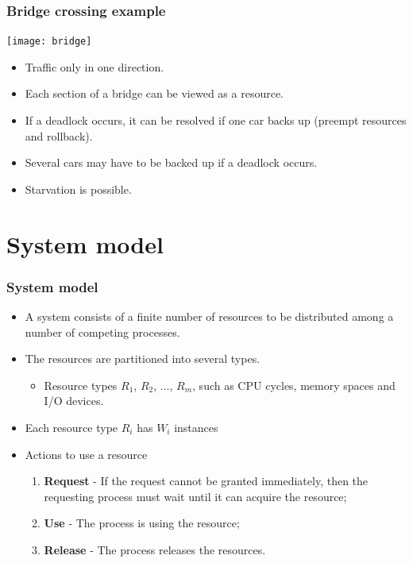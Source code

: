 \documentclass[CJKutf8,xcolor=pdftex,dvipsnames,table]{beamer}
\begin{document}
\begin{CJK*}{UTF8}{song}
  \begin{frame}
  \frametitle{Bridge crossing example} \pause
  \begin{center}
    \texttt{[image: bridge]} \pause
  \end{center}
  \begin{itemize}
  \item{Traffic only in one direction.} \pause
  \item{Each section of a bridge can be viewed as a resource.} \pause
  \item{If a deadlock occurs, it can be resolved if one car backs up (preempt resources and rollback).} \pause
  \item{Several cars may have to be backed up if a deadlock occurs.} \pause
  \item{Starvation is possible.}
  \end{itemize}
  \end{frame}

\section{System model}

  \begin{frame}
  \frametitle{System model} \pause
  \begin{itemize}
  \item{A system consists of a finite number of resources to be distributed among a number of competing processes.} \pause
  \item{The resources are partitioned into several types.} \pause
    \begin{itemize}
    \item{Resource types $R_1$, $R_2$, ..., $R_m$, such as CPU cycles, memory spaces and I/O devices.} \pause
    \end{itemize}
  \item{Each resource type $R_i$ has $W_i$ instances} \pause
  \item{Actions to use a resource} \pause
    \begin{enumerate}
    \item{\textbf{Request} \pause - If the request cannot be granted immediately, then the requesting process must wait until it can acquire the resource;} \pause
    \item{\textbf{Use} \pause - The process is using the resource;} \pause
    \item{\textbf{Release} \pause - The process releases the resources.}
    \end{enumerate}
  \end{itemize}
  \end{frame}


\end{CJK*}
\end{document}
